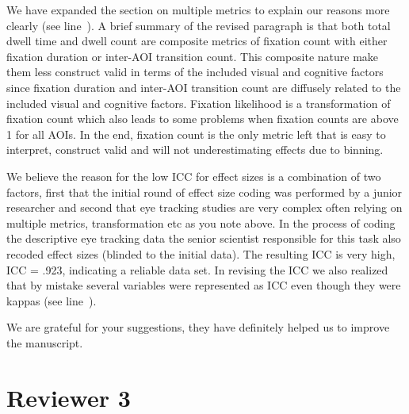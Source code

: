 
We have expanded the section on multiple metrics to explain our reasons more clearly (see line~). A brief summary of the revised paragraph is that both total dwell time and dwell count are composite metrics of fixation count with either fixation duration or inter-AOI transition count. This composite nature make them less construct valid in terms of the included visual and cognitive factors since fixation duration and inter-AOI transition count are diffusely related to the included visual and cognitive factors. Fixation likelihood is a transformation of fixation count which also leads to some problems when fixation counts are above 1 for all AOIs. In the end, fixation count is the only metric left that is easy to interpret, construct valid and will not underestimating effects due to binning. 


We believe the reason for the low ICC for effect sizes is a combination of two factors, first that the initial round of effect size coding was performed by a junior researcher and second that eye tracking studies are very complex often relying on multiple metrics, transformation etc as you note above. In the process of coding the descriptive eye tracking data the senior scientist responsible for this task also recoded effect sizes (blinded to the initial data). The resulting ICC is very high, ICC = .923, indicating a reliable data set. In revising the ICC we also realized that by mistake several variables were represented as ICC even though they were kappas (see line~).



We are grateful for your suggestions, they have definitely helped us to improve the manuscript.




\section{Reviewer 3}
\label{rev:r3}

